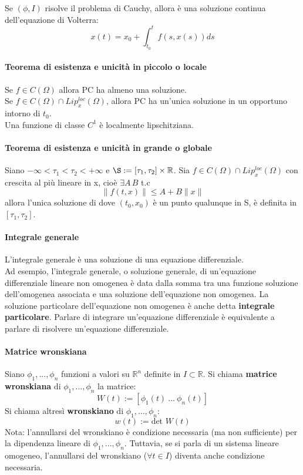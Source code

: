 \documentclass[a4paper,12pt]{article}
\begin{document}
Se $\left(\phi,I\right)$ risolve il problema di Cauchy, allora è una soluzione continua dell'equazione di Volterra:
$$ x\left(t\right) = x_0 + \displaystyle\int^t_{t_0} f\left(s,x\left(s\right)\right) ds $$

\paragraph{Teorema di esistenza e unicità in piccolo o locale}
Se $f \in C\left(\Omega\right)$ allora PC ha almeno una soluzione. \\
Se $f \in C\left(\Omega\right) \cap Lip^{loc}_x\left(\Omega\right)$, allora PC ha un'unica soluzione in un opportuno intorno di $t_0$.\\
Una funzione di classe $C^1$ è localmente lipschitziana. 

\paragraph{Teorema di esistenza e unicità in grande o globale}
Siano $-\infty < \tau_1 < \tau_2 < +\infty$ e $\S:=\left[\tau_1,\tau_2\right]\times\mathbb{R}$. Sia $f \in C\left(\Omega\right) \cap Lip^{loc}_x\left(\Omega\right)$ con crescita al più lineare in x, cioè $\exists A\,B$ t.c 
$$ \|f \left(t,x\right)\|\leq A + B\|x\|$$
allora l'unica soluzione di
dove $\left(t_0,x_0\right)$ è un punto qualunque in S, è definita in $\left[\tau_1,\tau_2\right]$.


\paragraph{Integrale generale}
L'integrale generale è una soluzione di una equazione differenziale.\\
Ad esempio, l'integrale generale, o soluzione generale, di un'equazione differenziale lineare non omogenea è data dalla somma tra una funzione soluzione dell'omogenea associata e una soluzione dell'equazione non omogenea. La soluzione particolare dell'equazione non omogenea è anche detta \textbf{integrale particolare}. Parlare di integrare un'equazione differenziale è equivalente a parlare di risolvere un'equazione differenziale.

\paragraph{Matrice wronskiana}
Siano $\phi_1,...,\phi_n$ funzioni a valori su $\mathbb{R}^n$ definite in $I\subset \mathbb{R}$.
Si chiama \textbf{matrice wronskiana} di $\phi_1,...,\phi_n$ la matrice:
$$W(t):=[\phi_1(t)\ ...\ \phi_n(t)]$$
Si chiama altresì \textbf{wronskiano} di $\phi_1,...,\phi_n$:
$$w(t):=\text{det } W(t)$$
Nota: l'annullarsi del wronskiano è condizione necessaria (ma non sufficiente) per la dipendenza lineare di $\phi_1,...,\phi_n$. Tuttavia, se si parla di un sistema lineare omogeneo, l'annullarsi del wronskiano ($\forall t \in I$) diventa anche condizione necessaria.
\end{document}
